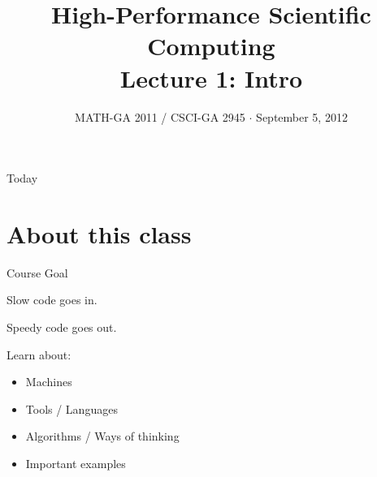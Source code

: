 \documentclass[english,compress]{beamer}
\begin{document}

\title{High-Performance Scientific Computing\\Lecture 1: Intro}

\date{MATH-GA 2011 / CSCI-GA 2945 $\cdot$ September 5, 2012}

\frame{\titlepage}

\begin{frame}{Today}
  \tableofcontents[hideallsubsections]
\end{frame}
\section{About this class}
\begin{frame}{Course Goal}

  \begin{center}
    \Large
    Slow code goes in.

    \Huge
    Speedy code goes out.
  \end{center}

  \hrulefill

  \bigskip
  Learn about:
  \begin{itemize}
    \item Machines
    \item Tools / Languages
    \item Algorithms / Ways of thinking
    \item Important examples
  \end{itemize}
\end{frame}
\end{document}
